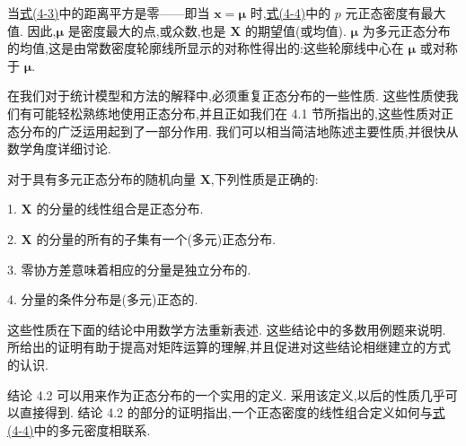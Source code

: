 当\hyperref[eq:4-3]{式(4-3)}中的距离平方是零——即当 $\mathbf{x}=\boldsymbol{\mu}$ 时,\hyperref[eq:4-4]{式(4-4)}中的 $p$ 元正态密度有最大值. 因此,$\boldsymbol{\mu}$ 是密度最大的点,或众数,也是 $\mathbf{X}$ 的期望值(或均值). $\boldsymbol{\mu}$ 为多元正态分布的均值,这是由常数密度轮廓线所显示的对称性得出的:这些轮廓线中心在 $\boldsymbol{\mu}$ 或对称于 $\boldsymbol{\mu}$.


在我们对于统计模型和方法的解释中,必须重复正态分布的一些性质. 这些性质使我们有可能轻松熟练地使用正态分布,并且正如我们在 4.1 节所指出的,这些性质对正态分布的广泛运用起到了一部分作用. 我们可以相当简洁地陈述主要性质,并很快从数学角度详细讨论.

对于具有多元正态分布的随机向量 $\mathbf{X}$,下列性质是正确的:

1. $\mathbf{X}$ 的分量的线性组合是正态分布.

2. $\mathbf{X}$ 的分量的所有的子集有一个(多元)正态分布.

3. 零协方差意味着相应的分量是独立分布的.

4. 分量的条件分布是(多元)正态的.

这些性质在下面的结论中用数学方法重新表述. 这些结论中的多数用例题来说明. 所给出的证明有助于提高对矩阵运算的理解,并且促进对这些结论相继建立的方式的认识.

结论 4.2 可以用来作为正态分布的一个实用的定义. 采用该定义,以后的性质几乎可以直接得到. 结论 4.2 的部分的证明指出,一个正态密度的线性组合定义如何与\hyperref[eq:4-4]{式(4-4)}中的多元密度相联系.


